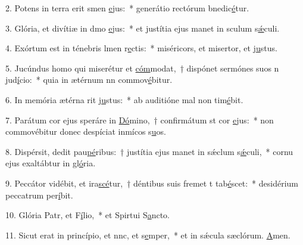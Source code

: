 2. Potens in terra erit smen \uline{e}jus:~* generátio rectórum bnedic\uline{é}tur.\par 
3. Glória, et divítiæ in dmo \uline{e}jus:~* et justítia ejus manet in sculum s\uline{ǽ}culi.\par 
4. Exórtum est in ténebris lmen r\uline{e}ctis:~* miséricors, et misertor, et j\uline{u}stus.\par 
5. Jucúndus homo qui miserétur et \uline{cóm}modat,~† dispónet sermónes suos n jud\uline{í}cio:~* quia in ætérnum nn commov\uline{é}bitur.\par 
6. In memória ætérna rit j\uline{u}stus:~* ab auditióne mal non tim\uline{é}bit.\par 
7. Parátum cor ejus speráre in \uline{Dó}mino,~† confirmátum st cor \uline{e}jus:~* non commovébitur donec despíciat inmícos s\uline{u}os.\par 
8. Dispérsit, dedit pau\uline{pé}ribus:~† justítia ejus manet in sǽclum s\uline{ǽ}culi,~* cornu ejus exaltábtur in gl\uline{ó}ria.\par 
9. Peccátor vidébit, et ira\uline{scé}tur,~† déntibus suis fremet t tab\uline{é}scet:~* desidérium peccatrum per\uline{í}bit.\par 
10. Glória Patr, et F\uline{í}lio,~* et Spirtui S\uline{a}ncto.\par 
11. Sicut erat in princípio, et nnc, et s\uline{e}mper,~* et in sǽcula sæclórum. \uline{A}men.\par 

